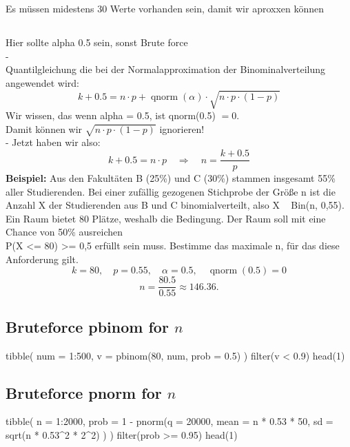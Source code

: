 \normalsize
\columnbreak
\section{}
Es müssen midestens 30 Werte vorhanden sein, damit wir aproxxen können
\subsection{}
\normalsize
\large{\textcolor{red}{\warning} Hier sollte alpha 0.5 sein, sonst 
Brute force \textcolor{red}{\warning}}\\
-\\
\normalsize
Quantilgleichung die bei der Normalapproximation der Binominalverteilung angewendet wird:
\large
\[
k + 0.5 = n \cdot p + \operatorname{qnorm}(\alpha) \cdot \sqrt{n \cdot p \cdot (1-p)}
\]
\normalsize
Wir wissen, das wenn alpha = 0.5, ist qnorm(0.5) $=0$.\\
Damit können wir $\sqrt{n \cdot p \cdot (1-p)}$ ignorieren!\\
- Jetzt haben wir also:\\
\large
\[
k + 0.5 = n \cdot p \quad\Longrightarrow\quad n = \frac{k+0.5}{p}
\]
\normalsize
\large{\textbf{Beispiel:}}
\normalsize
Aus den Fakultäten B (25\%) und C (30\%) stammen insgesamt 55\% aller Studierenden. Bei einer zufällig gezogenen Stichprobe der Größe n ist die Anzahl X der Studierenden aus B und C binomialverteilt, also X ~ Bin(n, 0,55). Ein Raum bietet 80 Plätze, weshalb die Bedingung. Der Raum soll mit eine Chance von 50\% ausreichen\\
P(X <= 80) >= 0,5
erfüllt sein muss. Bestimme das maximale n, für das diese Anforderung gilt.\\
\[
k = 80,\quad p = 0.55,\quad \alpha = 0.5,\quad \operatorname{qnorm}(0.5) = 0
\]\[
n = \frac{80.5}{0.55} \approx 146.36.
\]

\subsection{Bruteforce pbinom for $n$}
\begin{rcode}{1 }
tibble(
  num = 1:500,
  v = pbinom(80, num, prob = 0.5)
) %
  filter(v < 0.9) %
  head(1)
\end{rcode}
\subsection{Bruteforce pnorm for $n$}
\begin{rcode}{1}
tibble(
  n = 1:2000,
  prob = 1 - pnorm(q = 20000,
                   mean = n * 0.53 * 50,
                   sd = sqrt(n * 0.53^2 * 2^2)
                   )
) %
  filter(prob >= 0.95) %
  head(1)
\end{rcode}